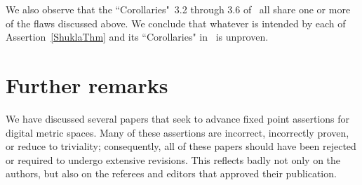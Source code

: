\documentclass{article}
\numberwithin{thm}{section}
\begin{document}
We also observe that the ``Corollaries"~3.2
through 3.6 of~\cite{Shukla} all share one or more of the
flaws discussed above.
We conclude that whatever is intended
by each of Assertion~\ref{ShuklaThm} and its ``Corollaries"
in~\cite{Shukla} is unproven.

\section{Further remarks}
We have discussed several papers that seek to advance
fixed point assertions for digital metric spaces.
Many of these assertions are incorrect, incorrectly proven, 
or reduce to triviality; consequently, all of these
papers should have been rejected or required to undergo
extensive revisions. This reflects badly not only on
the authors, but also on the referees and editors that
approved their publication.
\end{document}
